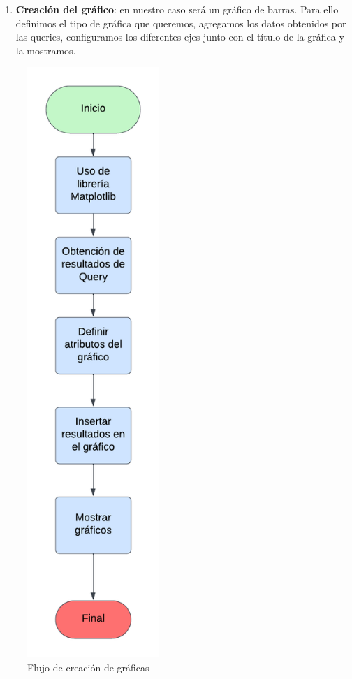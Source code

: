 \documentclass[a4paper, 12pt]{book}
\begin{document}
\begin{enumerate}
	
	\item \textbf{Creación del gráfico}: en nuestro caso será un gráfico de barras. Para ello definimos el tipo de gráfica que queremos, agregamos los datos obtenidos por las queries, configuramos los diferentes ejes junto con el título de la gráfica y la mostramos.
\end{enumerate}

\begin{figure}
	\centering
	\includegraphics[width=5cm, keepaspectratio]{img/Creación gráficas.png}
	\caption{Flujo de creación de gráficas}
	\label{fig:flujo creacion graficas}
\end{figure}
\end{document}
